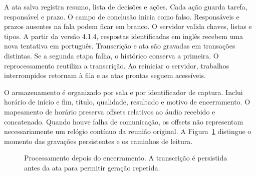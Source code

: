 \documentclass[12pt]{article}
\begin{document}
A ata salva registra resumo, lista de decisões e ações. Cada ação guarda tarefa, responsável e prazo. O campo de conclusão inicia como falso. Responsáveis e prazos ausentes na fala podem ficar em branco. O servidor valida chaves, listas e tipos. A partir da versão 4.1.4, respostas identificadas em inglês recebem uma nova tentativa em português. Transcrição e ata são gravadas em transações distintas. Se a segunda etapa falha, o histórico conserva a primeira. O reprocessamento reutiliza a transcrição. Ao reiniciar o servidor, trabalhos interrompidos retornam à fila e as atas prontas seguem acessíveis.

O armazenamento é organizado por sala e por identificador de captura. Inclui horário de início e fim, título, qualidade, resultado e motivo de encerramento. O mapeamento de horário preserva offsets relativos ao áudio recebido e concatenado. Quando houve falha de comunicação, os offsets não representam necessariamente um relógio contínuo da reunião original. A Figura~\ref{fig:processamento} distingue o momento das gravações persistentes e os caminhos de leitura.

\begin{figure}[htbp]
\centering
{}
\caption{Processamento depois do encerramento. A transcrição é persistida antes da ata para permitir geração repetida.}
\label{fig:processamento}
\end{figure}
\end{document}
